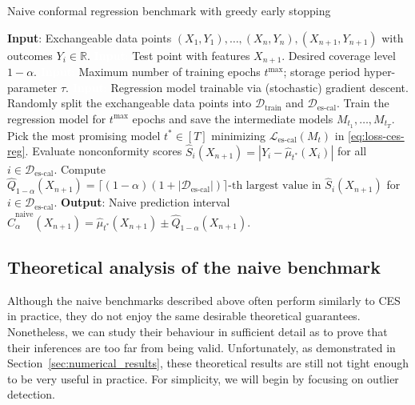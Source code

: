 \begin{algorithm}[H]
    \caption{Naive conformal regression benchmark with greedy early stopping}
    \label{alg:naive-reg}
    \begin{algorithmic}[1]
        \STATE \textbf{Input}: Exchangeable data points $(X_{1},Y_{1}), \ldots, (X_{n},Y_{n}), (X_{n+1},Y_{n+1})$ with outcomes $Y_i \in \mathbb{R}$.
        \STATE \textcolor{white}{\textbf{Input}:} Test point with features $X_{n+1}$. Desired coverage level $1-\alpha$.
        \STATE \textcolor{white}{\textbf{Input}:} Maximum number of training epochs $t^{\max}$; storage period hyper-parameter $\tau$.
        \STATE \textcolor{white}{\textbf{Input}:} Regression model trainable via (stochastic) gradient descent.
        \STATE Randomly split the exchangeable data points into $\mathcal{D}_{\text{train}}$ and $\mathcal{D}_{\text{es-cal}}$.
        \STATE Train the regression model for $t^{\text{max}}$ epochs and save the intermediate models $M_{t_1} , \dots, M_{t_T}$.
        \STATE Pick the most promising model $t^* \in [T]$ minimizing $\mathcal{L}_{\text{es-cal}}(M_t)$ in \eqref{eq:loss-ces-reg}.
        \STATE Evaluate nonconformity scores $\hat{S}_i(X_{n+1}) = | Y_i - \hat{\mu}_{t^*}(X_{i})|$ for all $i \in \mathcal{D}_{\text{es-cal}}$.
        \STATE Compute $\hat{Q}_{1-\alpha}(X_{n+1}) = \lceil (1-\alpha)(1+|\mathcal{D}_{\text{es-cal}}|) \rceil\text{-th largest value in }
        \hat{S}_i(X_{n+1})$ for $i \in \mathcal{D}_{\text{es-cal}}$.
        \STATE \textbf{Output}: Naive prediction interval $\hat{C}^{\text{naive}}_{\alpha}(X_{n+1}) = \hat{\mu}_{t^*}(X_{n+1}) \pm \hat{Q}_{1-\alpha}(X_{n+1})$.
    \end{algorithmic}
\end{algorithm}




\subsection{Theoretical analysis of the naive benchmark} \label{app:naive-analysis}

Although the naive benchmarks described above often perform similarly to CES in practice, they do not enjoy the same desirable theoretical guarantees.
Nonetheless, we can study their behaviour in sufficient detail as to prove that their inferences are too far from being valid.
Unfortunately, as demonstrated in Section~\ref{sec:numerical_results}, these theoretical results are still not tight enough to be very useful in practice.
For simplicity, we will begin by focusing on outlier detection.


